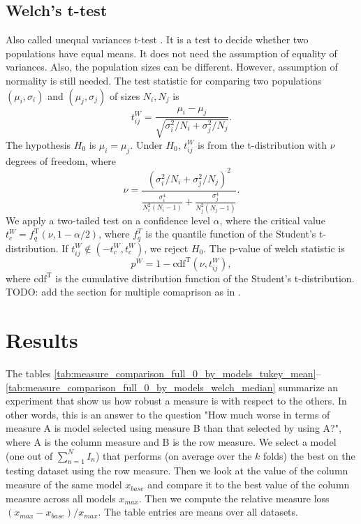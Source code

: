 \documentclass[a4paper]{article}
\begin{document}
\subsection{Welch's t-test}
Also called unequal variances t-test \cite{welch1947generalization}. It is a test to decide whether two populations have equal means. It does not need the assumption of equality of variances. Also, the population sizes can be different. However, assumption of normality is still needed. The test statistic for comparing two populations $(\mu_i, \sigma_i)$ and $(\mu_j, \sigma_j)$ of sizes $N_i,N_j$ is
\begin{equation}
	t^W_{ij} = \frac{\mu_i - \mu_j}{\sqrt{\sigma_i^2/N_i + \sigma_j^2/N_j}}.
\end{equation}
The hypothesis $H_0$ is $\mu_i = \mu_j$. Under $H_0$, $t^W_{ij}$ is from the t-distribution with $\nu$ degrees of freedom, where 
\begin{equation}
	\nu = \frac{\left( \sigma_i^2/N_i + \sigma_j^2/N_j\right)^2}{\frac{\sigma_i^4}{N^2_i(N_i-1)} + \frac{\sigma_j^4}{N^2_j(N_j-1)}}.
\end{equation}
We apply a two-tailed test on a confidence level $\alpha$, where the critical value $t^W_c = f_q^\text{T}(\nu, 1-\alpha/2)$, where $f_q^T$ is the quantile function of the Student's t-distribution. If $t^W_{ij} \notin (-t^W_c, t^W_c)$, we reject $H_0$. The p-value of welch statistic is
\begin{equation}
	p^W = 1-\text{cdf}^\text{T}(\nu, t^W_{ij}),
\end{equation}
where $\text{cdf}^\text{T}$ is the cumulative distribution function of the Student's t-distribution. TODO: add the section for multiple comaprison as in \cite{welch1951comparison}.



\section{Results}
The tables \ref{tab:measure_comparison_full_0_by_models_tukey_mean}--\ref{tab:measure_comparison_full_0_by_models_welch_median} summarize an experiment that show us how robust a measure is with respect to the others. In other words, this is an answer to the question "How much worse in terms of measure A is model selected using measure B than that selected by using A?", where A is the column measure and B is the row measure. We select a model (one out of $\sum_{n=1}^N I_n$) that performs (on average over the $k$ folds) the best on the testing dataset using the row measure. Then we look at the value of the column measure of the same model $x_{base}$ and compare it to the best value of the column measure across all models $x_{max}$. Then we compute the relative measure loss $(x_{max}-x_{base})/x_{max}$.  The table entries are means over all datasets.
\end{document}
